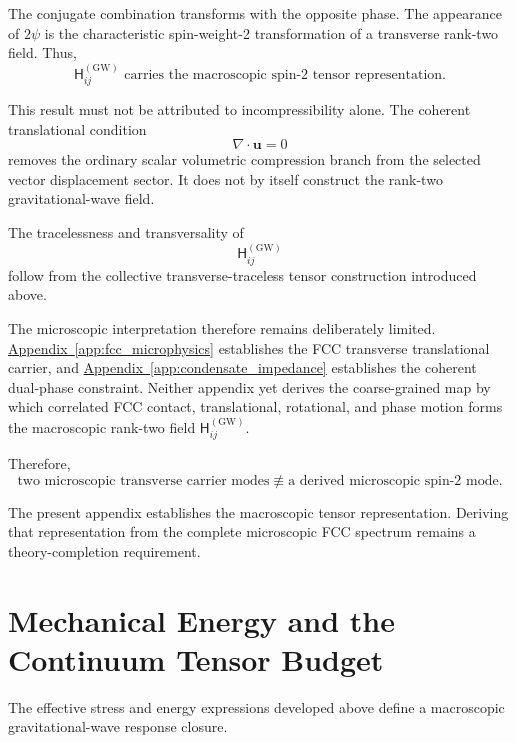 The conjugate combination transforms with the opposite phase. The appearance of $2\psi$ is the characteristic spin-weight-2 transformation of a transverse rank-two field. Thus,
\begin{equation}
    \mathsf{H}_{ij}^{(\mathrm{GW})} \text{ carries the macroscopic spin-2 tensor representation.}
\end{equation}

This result must not be attributed to incompressibility alone. The coherent translational condition
\begin{equation}
    \nabla\cdot\mathbf{u} = 0
\end{equation}
removes the ordinary scalar volumetric compression branch from the selected vector displacement sector. It does not by itself construct the rank-two gravitational-wave field.

The tracelessness and transversality of
\begin{equation}
    \mathsf{H}_{ij}^{(\mathrm{GW})}
\end{equation}
follow from the collective transverse-traceless tensor construction introduced above.

The microscopic interpretation therefore remains deliberately limited. \hyperref[app:fcc_microphysics]{Appendix~\ref*{app:fcc_microphysics}} establishes the FCC transverse translational carrier, and \hyperref[app:condensate_impedance]{Appendix~\ref*{app:condensate_impedance}} establishes the coherent dual-phase constraint. Neither appendix yet derives the coarse-grained map by which correlated FCC contact, translational, rotational, and phase motion forms the macroscopic rank-two field $\mathsf{H}_{ij}^{(\mathrm{GW})}$.

Therefore,
\begin{equation}
    \text{two microscopic transverse carrier modes} \not\equiv \text{a derived microscopic spin-2 mode}.
\end{equation}

The present appendix establishes the macroscopic tensor representation. Deriving that representation from the complete microscopic FCC spectrum remains a theory-completion requirement.

\section{Mechanical Energy and the Continuum Tensor Budget}

The effective stress and energy expressions developed above define a macroscopic gravitational-wave response closure.

